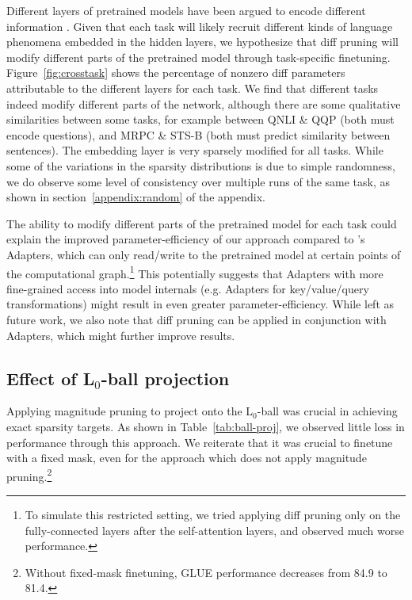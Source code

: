 Different layers of  pretrained models have been argued to encode different information \citep{liu_et_al,tenney2019bert}. Given that each task will likely recruit different kinds of language phenomena embedded in the hidden layers, we hypothesize that diff pruning will modify different parts of the pretrained model through task-specific finetuning. Figure~\ref{fig:crosstask} shows the percentage of nonzero diff parameters attributable to the different layers for each task. We find that different tasks indeed modify different parts of the network, although there are some qualitative similarities between some tasks, for example between QNLI \& QQP (both must encode  questions), and MRPC \& STS-B (both must predict similarity between sentences). The embedding layer is very sparsely modified for all tasks. While some of the variations in the  sparsity distributions is due to simple randomness, we do observe some level of  consistency over multiple runs of the same task, as shown in section~\ref{appendix:random} of the appendix.

The ability to modify different parts of the pretrained model for each task could explain the improved parameter-efficiency of our approach compared to \citet{houlsby2019adapters}'s Adapters, which can only read/write to the pretrained model at certain points of the computational graph.\footnote{To simulate this restricted setting, we tried applying diff pruning only on the  fully-connected layers after the self-attention layers, and observed much worse performance.} This potentially suggests that Adapters with more fine-grained access into model internals (e.g. Adapters for key/value/query transformations) might result in even greater parameter-efficiency. While left as future work, we also note that diff pruning can be applied in conjunction with Adapters, which might further improve results.

\subsection{Effect of L$_0$-ball projection}

Applying magnitude pruning to project onto the L$_0$-ball was crucial in achieving exact sparsity targets. As shown in Table~\ref{tab:ball-proj}, we observed little loss in performance through this approach. We reiterate that it was crucial to finetune with a fixed mask, even for the approach which does not apply magnitude pruning.\footnote{Without fixed-mask finetuning, GLUE performance decreases from 84.9 to 81.4.}

